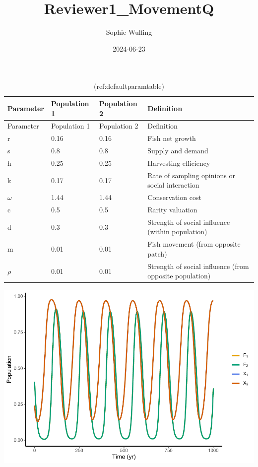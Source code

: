 \documentclass[
]{article}
\title{Reviewer1\_MovementQ}
\author{Sophie Wulfing}
\date{2024-06-23}
\begin{document}
\maketitle

\begin{longtable}[]{@{}llll@{}}
\caption{\label{tab:DefaultParamTable}(ref:defaultparamtable) \label{DefaultParamTable}}\tabularnewline
\toprule\noalign{}
Parameter & Population 1 & Population 2 & Definition \\
\midrule\noalign{}
\endfirsthead
\toprule\noalign{}
Parameter & Population 1 & Population 2 & Definition \\
\midrule\noalign{}
\endhead
\bottomrule\noalign{}
\endlastfoot
r & 0.16 & 0.16 & Fish net growth \\
s & 0.8 & 0.8 & Supply and demand \\
h & 0.25 & 0.25 & Harvesting efficiency \\
k & 0.17 & 0.17 & Rate of sampling opinions or social interaction \\
\(\omega\) & 1.44 & 1.44 & Conservation cost \\
c & 0.5 & 0.5 & Rarity valuation \\
d & 0.3 & 0.3 & Strength of social influence (within population) \\
m & 0.01 & 0.01 & Fish movement (from opposite patch) \\
\(\rho\) & 0.01 & 0.01 & Strength of social influence (from opposite population) \\
\end{longtable}

\includegraphics{ReviewerMovementTest_files/figure-latex/Bauch.Coupled-1.pdf}
\end{document}
